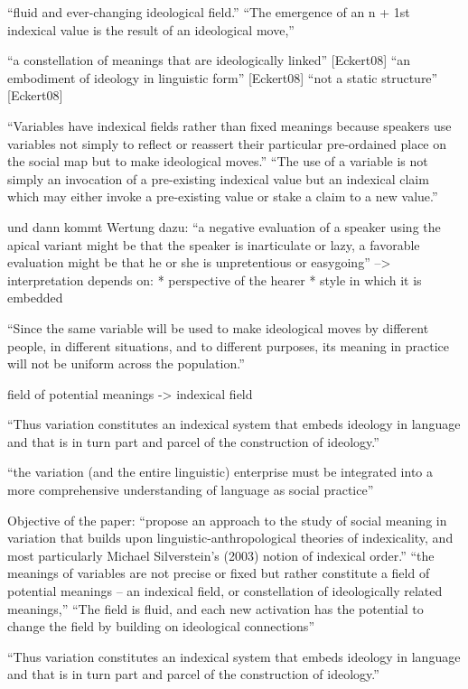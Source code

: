 ``fluid and ever-changing ideological field.''
``The emergence of an n + 1st indexical value is the result of an ideological move,''


``a constellation of meanings that are ideologically linked'' [Eckert08]
``an embodiment of ideology in linguistic form'' [Eckert08]
``not a static structure'' [Eckert08]

``Variables have indexical fields rather than fixed meanings because speakers use
variables not simply to reflect or reassert their particular pre-ordained place
on the social map but to make ideological moves.''
``The use of a variable is not
simply an invocation of a pre-existing indexical value but an indexical claim
which may either invoke a pre-existing value or stake a claim to a new value.''

und dann kommt Wertung dazu:
``a negative evaluation of a speaker using
the apical variant might be that the speaker is inarticulate or lazy, a favorable
evaluation might be that he or she is unpretentious or easygoing''
--> interpretation depends on:
* perspective of the hearer
* style in which it is embedded

``Since the same variable will be used to make ideological moves by different
people, in different situations, and to different purposes, its meaning in practice
will not be uniform across the population.''

field of potential meanings -> indexical field

``Thus variation constitutes an indexical system
that embeds ideology in language and that is in turn part and parcel of the
construction of ideology.''

``the variation (and the entire linguistic) enterprise must
be integrated into a more comprehensive understanding of language as social
practice''

Objective of the paper:
``propose an approach to the study of social meaning in variation that builds
upon linguistic-anthropological theories of indexicality, and most particularly
Michael Silverstein’s (2003) notion of indexical order.''
``the meanings
of variables are not precise or fixed but rather constitute a field of potential
meanings – an indexical field, or constellation of ideologically related meanings,''
``The field is fluid, and each new activation has the potential to change the field by
building on ideological connections''



``Thus variation constitutes an indexical system
that embeds ideology in language and that is in turn part and parcel of the
construction of ideology.''

